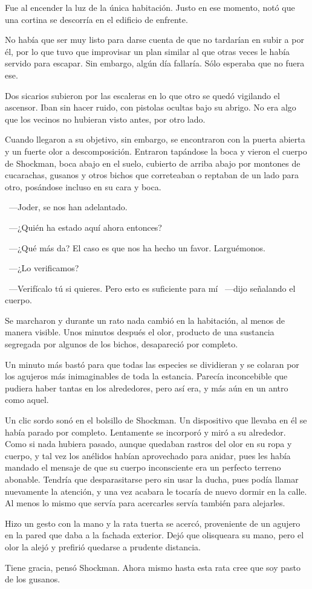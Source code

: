 Fue al encender la luz de la única habitación. Justo en ese momento, notó que una cortina se descorría en el edificio de enfrente.

No había que ser muy listo para darse cuenta de que no tardarían en subir a por él, por lo que tuvo que improvisar un plan similar al que otras veces le había servido para escapar. Sin embargo, algún día fallaría. Sólo esperaba que no fuera ese.

Dos sicarios subieron por las escaleras en lo que otro se quedó vigilando el ascensor. Iban sin hacer ruido, con pistolas ocultas bajo su abrigo. No era algo que los vecinos no hubieran visto antes, por otro lado.

Cuando llegaron a su objetivo, sin embargo, se encontraron con la puerta abierta y un fuerte olor a descomposición. Entraron tapándose la boca y vieron el cuerpo de Shockman, boca abajo en el suelo, cubierto de arriba abajo por montones de cucarachas, gusanos y otros bichos que correteaban o reptaban de un lado para otro, posándose incluso en su cara y boca.

~---Joder, se nos han adelantado.

~---¿Quién ha estado aquí ahora entonces?

~---¿Qué más da? El caso es que nos ha hecho un favor. Larguémonos.

~---¿Lo verificamos?

~---Verifícalo tú si quieres. Pero esto es suficiente para mí ~---dijo señalando el cuerpo.

Se marcharon y durante un rato nada cambió en la habitación, al menos de manera visible. Unos minutos después el olor, producto de una sustancia segregada por algunos de los bichos, desapareció por completo.

Un minuto más bastó para que todas las especies se dividieran y se colaran por los agujeros más inimaginables de toda la estancia. Parecía inconcebible que pudiera haber tantas en los alrededores, pero así era, y más aún en un antro como aquel.

Un clic sordo sonó en el bolsillo de Shockman. Un dispositivo que llevaba en él se había parado por completo. Lentamente se incorporó y miró a su alrededor. Como si nada hubiera pasado, aunque quedaban rastros del olor en su ropa y cuerpo, y tal vez los anélidos habían aprovechado para anidar, pues les había mandado el mensaje de que su cuerpo inconsciente era un perfecto terreno abonable. Tendría que desparasitarse pero sin usar la ducha, pues podía llamar nuevamente la atención, y una vez acabara le tocaría de nuevo dormir en la calle. Al menos lo mismo que servía para acercarles servía también para alejarles.

Hizo un gesto con la mano y la rata tuerta se acercó, proveniente de un agujero en la pared que daba a la fachada exterior. Dejó que olisqueara su mano, pero el olor la alejó y prefirió quedarse a prudente distancia.

Tiene gracia, pensó Shockman. Ahora mismo hasta esta rata cree que soy pasto de los gusanos.

\endinput
